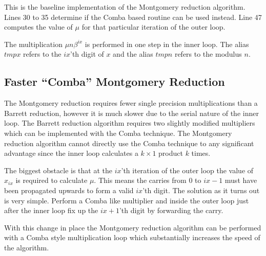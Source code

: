 \documentclass[b5paper]{book}
\begin{document}
This is the baseline implementation of the Montgomery reduction algorithm.  Lines 30 to 35 determine if the Comba based
routine can be used instead.  Line 47 computes the value of $\mu$ for that particular iteration of the outer loop.  

The multiplication $\mu n \beta^{ix}$ is performed in one step in the inner loop.  The alias $tmpx$ refers to the $ix$'th digit of $x$ and
the alias $tmpn$ refers to the modulus $n$.  

\subsection{Faster ``Comba'' Montgomery Reduction}

The Montgomery reduction requires fewer single precision multiplications than a Barrett reduction, however it is much slower due to the serial
nature of the inner loop.  The Barrett reduction algorithm requires two slightly modified multipliers which can be implemented with the Comba
technique.  The Montgomery reduction algorithm cannot directly use the Comba technique to any significant advantage since the inner loop calculates
a $k \times 1$ product $k$ times. 

The biggest obstacle is that at the $ix$'th iteration of the outer loop the value of $x_{ix}$ is required to calculate $\mu$.  This means the 
carries from $0$ to $ix - 1$ must have been propagated upwards to form a valid $ix$'th digit.  The solution as it turns out is very simple.  
Perform a Comba like multiplier and inside the outer loop just after the inner loop fix up the $ix + 1$'th digit by forwarding the carry.  

With this change in place the Montgomery reduction algorithm can be performed with a Comba style multiplication loop which substantially increases
the speed of the algorithm.  
\end{document}
